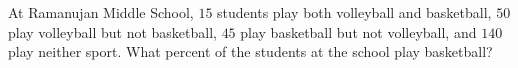 At Ramanujan Middle School, $15$ students play both volleyball and basketball, $50$ play volleyball but not basketball, $45$ play basketball but not volleyball, and $140$ play neither sport. What percent of the students at the school play basketball?
